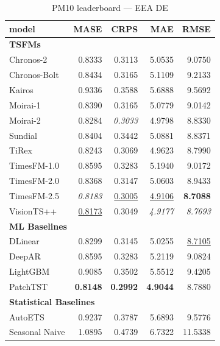 \begin{table}[H]
\caption{PM10 leaderboard --- EEA DE}
\centering
\begin{small}
\begin{tabular}{lrrrr}
\toprule
model & MASE & CRPS & MAE & RMSE \\
\midrule
\multicolumn{5}{l}{\textbf{TSFMs}} \\
Chronos-2 & 0.8333 & 0.3113 & 5.0535 & 9.0750 \\
Chronos-Bolt & 0.8434 & 0.3165 & 5.1109 & 9.2133 \\
Kairos & 0.9336 & 0.3588 & 5.6888 & 9.5692 \\
Moirai-1 & 0.8390 & 0.3165 & 5.0779 & 9.0142 \\
Moirai-2 & 0.8284 & \textit{0.3033} & 4.9798 & 8.8330 \\
Sundial & 0.8404 & 0.3442 & 5.0881 & 8.8371 \\
TiRex & 0.8243 & 0.3069 & 4.9623 & 8.7990 \\
TimesFM-1.0 & 0.8595 & 0.3283 & 5.1940 & 9.0172 \\
TimesFM-2.0 & 0.8368 & 0.3147 & 5.0603 & 8.9433 \\
TimesFM-2.5 & \textit{0.8183} & \underline{0.3005} & \underline{4.9106} & \textbf{8.7088} \\
VisionTS++ & \underline{0.8173} & 0.3049 & \textit{4.9177} & \textit{8.7693} \\
\midrule
\multicolumn{5}{l}{\textbf{ML Baselines}} \\
DLinear & 0.8299 & 0.3145 & 5.0255 & \underline{8.7105} \\
DeepAR & 0.8595 & 0.3283 & 5.2119 & 9.0824 \\
LightGBM & 0.9085 & 0.3502 & 5.5512 & 9.4205 \\
PatchTST & \textbf{0.8148} & \textbf{0.2992} & \textbf{4.9044} & 8.7880 \\
\midrule
\multicolumn{5}{l}{\textbf{Statistical Baselines}} \\
AutoETS & 0.9237 & 0.3787 & 5.6893 & 9.5776 \\
Seasonal Naive & 1.0895 & 0.4739 & 6.7322 & 11.5338 \\
\bottomrule
\end{tabular}
\end{small}
\end{table}